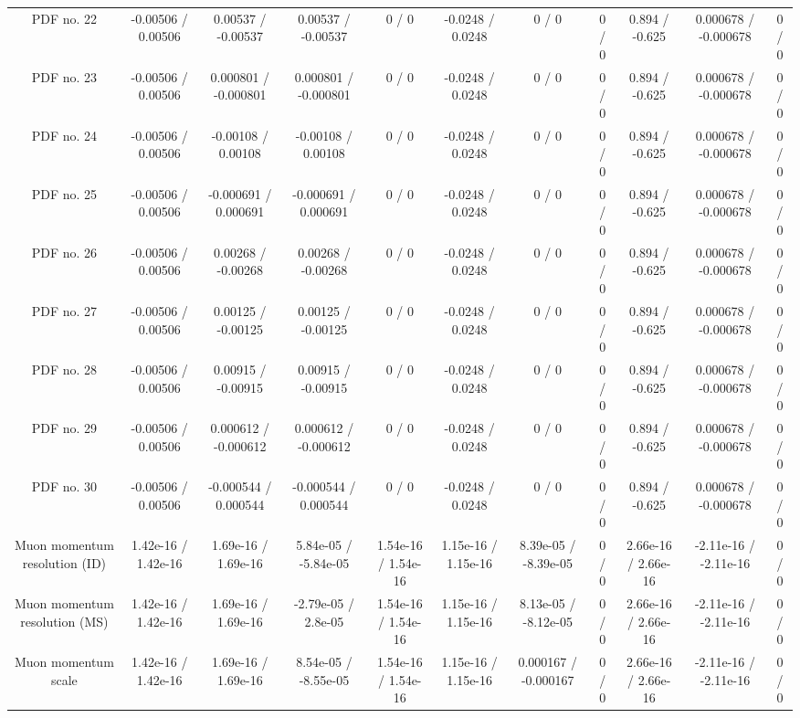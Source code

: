 \begin{table}[htbp]
\begin{center}
\begin{tabular}{|c|c|c|c|c|c|c|c|c|c|c|}
  PDF no. 22 & -0.00506 / 0.00506 & 0.00537 / -0.00537 & 0.00537 / -0.00537 & 0 / 0 & -0.0248 / 0.0248 & 0 / 0 & 0 / 0 & 0.894 / -0.625 & 0.000678 / -0.000678 & 0 / 0 \\ 
  PDF no. 23 & -0.00506 / 0.00506 & 0.000801 / -0.000801 & 0.000801 / -0.000801 & 0 / 0 & -0.0248 / 0.0248 & 0 / 0 & 0 / 0 & 0.894 / -0.625 & 0.000678 / -0.000678 & 0 / 0 \\ 
  PDF no. 24 & -0.00506 / 0.00506 & -0.00108 / 0.00108 & -0.00108 / 0.00108 & 0 / 0 & -0.0248 / 0.0248 & 0 / 0 & 0 / 0 & 0.894 / -0.625 & 0.000678 / -0.000678 & 0 / 0 \\ 
  PDF no. 25 & -0.00506 / 0.00506 & -0.000691 / 0.000691 & -0.000691 / 0.000691 & 0 / 0 & -0.0248 / 0.0248 & 0 / 0 & 0 / 0 & 0.894 / -0.625 & 0.000678 / -0.000678 & 0 / 0 \\ 
  PDF no. 26 & -0.00506 / 0.00506 & 0.00268 / -0.00268 & 0.00268 / -0.00268 & 0 / 0 & -0.0248 / 0.0248 & 0 / 0 & 0 / 0 & 0.894 / -0.625 & 0.000678 / -0.000678 & 0 / 0 \\ 
  PDF no. 27 & -0.00506 / 0.00506 & 0.00125 / -0.00125 & 0.00125 / -0.00125 & 0 / 0 & -0.0248 / 0.0248 & 0 / 0 & 0 / 0 & 0.894 / -0.625 & 0.000678 / -0.000678 & 0 / 0 \\ 
  PDF no. 28 & -0.00506 / 0.00506 & 0.00915 / -0.00915 & 0.00915 / -0.00915 & 0 / 0 & -0.0248 / 0.0248 & 0 / 0 & 0 / 0 & 0.894 / -0.625 & 0.000678 / -0.000678 & 0 / 0 \\ 
  PDF no. 29 & -0.00506 / 0.00506 & 0.000612 / -0.000612 & 0.000612 / -0.000612 & 0 / 0 & -0.0248 / 0.0248 & 0 / 0 & 0 / 0 & 0.894 / -0.625 & 0.000678 / -0.000678 & 0 / 0 \\ 
  PDF no. 30 & -0.00506 / 0.00506 & -0.000544 / 0.000544 & -0.000544 / 0.000544 & 0 / 0 & -0.0248 / 0.0248 & 0 / 0 & 0 / 0 & 0.894 / -0.625 & 0.000678 / -0.000678 & 0 / 0 \\ 
  Muon momentum resolution (ID) & 1.42e-16 / 1.42e-16 & 1.69e-16 / 1.69e-16 & 5.84e-05 / -5.84e-05 & 1.54e-16 / 1.54e-16 & 1.15e-16 / 1.15e-16 & 8.39e-05 / -8.39e-05 & 0 / 0 & 2.66e-16 / 2.66e-16 & -2.11e-16 / -2.11e-16 & 0 / 0 \\ 
  Muon momentum resolution (MS) & 1.42e-16 / 1.42e-16 & 1.69e-16 / 1.69e-16 & -2.79e-05 / 2.8e-05 & 1.54e-16 / 1.54e-16 & 1.15e-16 / 1.15e-16 & 8.13e-05 / -8.12e-05 & 0 / 0 & 2.66e-16 / 2.66e-16 & -2.11e-16 / -2.11e-16 & 0 / 0 \\ 
  Muon momentum scale & 1.42e-16 / 1.42e-16 & 1.69e-16 / 1.69e-16 & 8.54e-05 / -8.55e-05 & 1.54e-16 / 1.54e-16 & 1.15e-16 / 1.15e-16 & 0.000167 / -0.000167 & 0 / 0 & 2.66e-16 / 2.66e-16 & -2.11e-16 / -2.11e-16 & 0 / 0 \\ 

\end{tabular}
\end{center}
\end{table}
